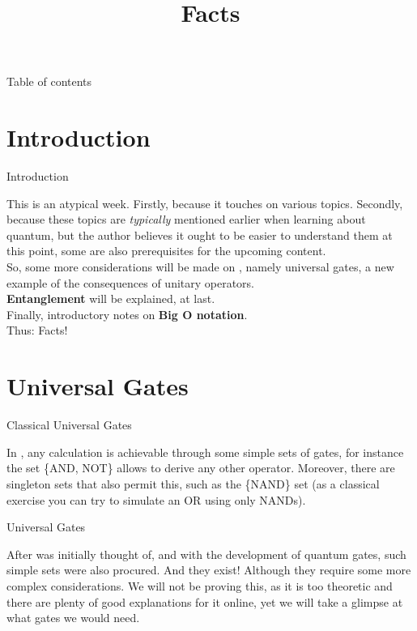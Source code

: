 \documentclass[aspectratio=43]{beamer}
\title{\q Facts}
\begin{document}
\begin{frame}
	\titlepage
\end{frame}


\begin{frame}{Table of contents}
	\begin{card}
		\tableofcontents
	\end{card}
\end{frame}


\section{Introduction}
\begin{frame}{Introduction}
    \begin{card}
    This is an atypical week. Firstly, because it touches on various topics. Secondly, because these topics are \textit{typically} mentioned earlier when learning about quantum, but the author believes it ought to be easier to understand them at this point, some are also prerequisites for the upcoming content.\\
    So, some more considerations will be made on \textbf{\qcts}, namely universal gates, a new example of the consequences of unitary operators.\\ \textbf{Entanglement} will be explained, at last.\\ Finally, introductory notes on \textbf{Big O notation}.\\
    Thus: \q Facts!
    \end{card}
\pagenumber
\end{frame}

\section{Universal Gates}
\begin{frame}{Classical Universal Gates}
\begin{card}
    In \cc, any calculation is achievable through some simple sets of gates, for instance the set \{AND, NOT\} allows to derive any other operator. Moreover, there are singleton sets that also permit this, such as the \{NAND\} set (as a classical exercise you can try to simulate an OR using only NANDs).
\end{card}
\pagenumber
\end{frame}

\begin{frame}{\q Universal Gates}
\begin{card}
    After \qc was initially thought of, and with the development of quantum gates, such simple sets were also procured. And they exist! Although they require some more complex considerations. We will not be proving this, as it is too theoretic and there are plenty of good explanations for it online, yet we will take a glimpse at what gates  we would need.
\end{card}
\pagenumber
\end{frame}
\end{document}
